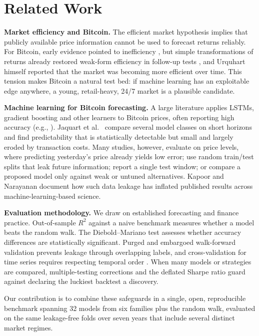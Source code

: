 \section{Related Work}
\label{sec:related}

\textbf{Market efficiency and Bitcoin.} The efficient market hypothesis \cite{fama1970} implies that publicly available price information cannot be used to forecast returns reliably. For Bitcoin, early evidence pointed to inefficiency \cite{urquhart2016}, but simple transformations of returns already restored weak-form efficiency in follow-up tests \cite{nadarajah2017}, and Urquhart himself reported that the market was becoming more efficient over time. This tension makes Bitcoin a natural test bed: if machine learning has an exploitable edge anywhere, a young, retail-heavy, 24/7 market is a plausible candidate.

\textbf{Machine learning for Bitcoin forecasting.} A large literature applies LSTMs, gradient boosting and other learners to Bitcoin prices, often reporting high accuracy (e.g., \cite{mcnally2018}). Jaquart et al.~\cite{jaquart2021} compare several model classes on short horizons and find predictability that is statistically detectable but small and largely eroded by transaction costs. Many studies, however, evaluate on price levels, where predicting yesterday's price already yields low error; use random train/test splits that leak future information; report a single test window; or compare a proposed model only against weak or untuned alternatives. Kapoor and Narayanan \cite{kapoor2023} document how such data leakage has inflated published results across machine-learning-based science.

\textbf{Evaluation methodology.} We draw on established forecasting and finance practice. Out-of-sample $R^2$ against a naive benchmark \cite{campbell2008, welch2008} measures whether a model beats the random walk. The Diebold--Mariano test \cite{diebold1995} assesses whether accuracy differences are statistically significant. Purged and embargoed walk-forward validation \cite{lopezdeprado2018} prevents leakage through overlapping labels, and cross-validation for time series requires respecting temporal order \cite{bergmeir2012}. When many models or strategies are compared, multiple-testing corrections \cite{holm1979, harvey2016} and the deflated Sharpe ratio \cite{bailey2014} guard against declaring the luckiest backtest a discovery.

Our contribution is to combine these safeguards in a single, open, reproducible benchmark spanning 32 models from six families plus the random walk, evaluated on the same leakage-free folds over seven years that include several distinct market regimes.
